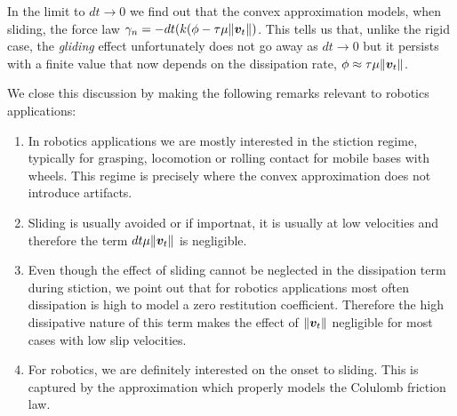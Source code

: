 In the limit to $dt\rightarrow 0$ we find out that the convex approximation
models, when sliding, the force law
$\gamma_n=-dt(k(\phi-\tau\mu\Vert{\bm{v}}_t\Vert)$. This tells us that, unlike the
rigid case, the \textit{gliding} effect unfortunately does not go away as
$dt\rightarrow 0$ but it persists with a finite value that now depends on the
dissipation rate, $\phi\approx\tau\mu\Vert{\bm{v}}_t\Vert$.

We close this discussion by making the following remarks relevant to robotics
applications:
\begin{enumerate}
	\item In robotics applications we are mostly interested in the stiction
	regime, typically for grasping, locomotion or rolling contact for mobile
	bases with wheels. This regime is precisely where the convex approximation
	does not introduce artifacts.
	\item Sliding is usually avoided or if importnat, it is usually at low
	velocities and therefore the term $dt\mu\Vert{\bm{v}}_t\Vert$ is negligible.
	\item Even though the effect of sliding cannot be neglected in the
	dissipation term during stiction, we point out that for robotics
	applications most often dissipation is high to model a zero restitution
	coefficient. Therefore the high dissipative nature of this term makes the
	effect of $\Vert{\bm{v}}_t\Vert$ negligible for most cases with low slip
	velocities.
	\item For robotics, we are definitely interested on the onset to sliding.
	This is captured by the approximation which properly models the Colulomb
	friction law.
\end{enumerate}
